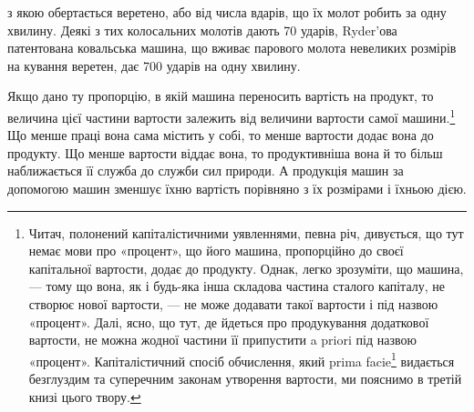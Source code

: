 \parcont{}  %
з якою обертається веретено, або від числа вдарів, що їх молот
робить за одну хвилину. Деякі з тих колосальних молотів дають
70 ударів, Ryder’ова патентована ковальська машина, що вживає
парового молота невеликих розмірів на кування веретен, дає
700 ударів на одну хвилину.

Якщо дано ту пропорцію, в якій машина переносить вартість
на продукт, то величина цієї частини вартости залежить від величини
вартости самої машини.\footnote{
Читач, полонений капіталістичними уявленнями, певна річ, дивується,
що тут немає мови про «процент», що його машина, пропорційно
до своєї капітальної вартости, додає до продукту. Однак, легко зрозуміти,
що машина, — тому що вона, як і будь-яка інша складова частина
сталого капіталу, не створює нової вартости, — не може додавати такої
вартости і під назвою «процент». Далі, ясно, що тут, де йдеться про продукування
додаткової вартости, не можна жодної частини її припустити
a priori під назвою «процент». Капіталістичний спосіб обчислення,
який prima facie\footnote*{
— на перший погляд. \emph{Ред.}
} видається безглуздим та суперечним законам утворення
вартости, ми пояснимо в третій книзі цього твору.
} Що менше праці вона сама містить
у собі, то менше вартости додає вона до продукту. Що менше
вартости віддає вона, то продуктивніша вона й то більш наближається
її служба до служби сил природи. А продукція машин за
допомогою машин зменшує їхню вартість порівняно з їх розмірами
і їхньою дією.

